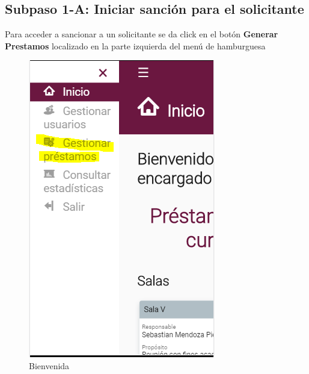 \subsection{Subpaso 1-A: Iniciar sanción para el solicitante}
	Para acceder a sancionar a un solicitante se da click en el botón
	 \textbf{Generar Prestamos} localizado en la parte izquierda del menú de 
	 hamburguesa 
	
	\begin{figure}[hbtp]

	\includegraphics[scale=0.3]{images/InterfazMovil/IUGS07_bienvenida.PNG}
	\caption{Bienvenida}
	\end{figure}

